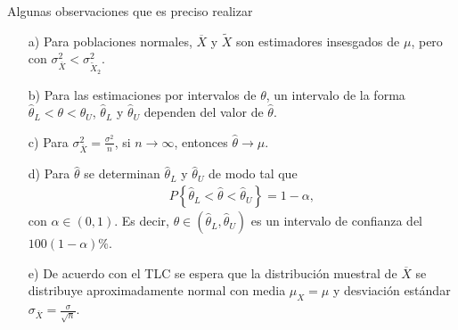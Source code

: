 Algunas observaciones que es preciso realizar

\begin{enumerate}
\item[a) ]Para poblaciones normales, $\overline{X}$ y $\tilde{X}$ son estimadores insesgados de $\mu$, pero con $\sigma_{\overline{X}}^{2}<\sigma_{\tilde{X}_{2}}^{2}$.

\item[b) ]Para las estimaciones por intervalos de $\theta$, un intervalo de la forma $\hat{\theta}_{L}<\theta<\hat{\theta}_{U}$,  $\hat{\theta}_{L}$ y $\hat{\theta}_{U}$ dependen del valor de $\hat{\theta}$.
\item[c) ]Para $\sigma_{\overline{X}}^{2}=\frac{\sigma^{2}}{n}$, si $n\rightarrow\infty$, entonces $\hat{\theta}\rightarrow\mu$.
\end{enumerate}










\begin{enumerate}
\item[d) ]Para $\hat{\theta}$ se determinan $\hat{\theta}_{L}$ y $\hat{\theta}_{U}$ de modo tal que 
\begin{eqnarray}
P\left\{\hat{\theta}_{L}<\hat{\theta}<\hat{\theta}_{U}\right\}=1-\alpha,
\end{eqnarray}
con $\alpha\in\left(0,1\right)$. Es decir, $\theta\in\left(\hat{\theta}_{L},\hat{\theta}_{U}\right)$ es un intervalo de confianza del $100\left(1-\alpha\right)\%$.

\item[e) ] De acuerdo con el TLC se espera que la distribuci\'on muestral de $\overline{X}$ se distribuye aproximadamente normal con media $\mu_{X}=\mu$ y desviaci\'on est\'andar $\sigma_{\overline{X}}=\frac{\sigma}{\sqrt{n}}$.

\end{enumerate}








